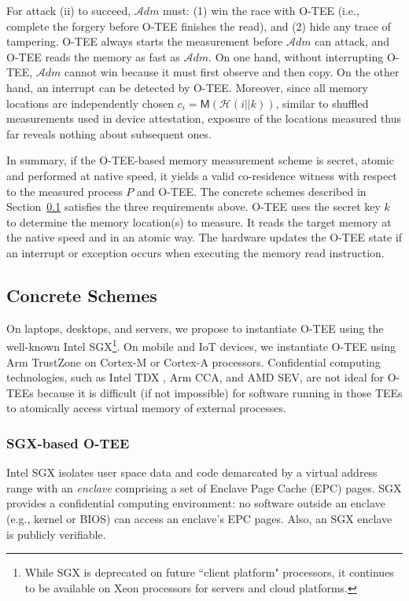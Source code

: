 \documentclass[letterpaper,twocolumn,10pt]{article}
\newcommand{\ADM}{\ensuremath{\mathcal{A}dm}\xspace}
\begin{document}
For attack (ii) to succeed, \ADM must: (1) win the race with O-TEE (i.e., complete the forgery before
O-TEE finishes the read), and (2) hide any trace of tampering. O-TEE always starts the measurement before
\ADM can attack, and O-TEE reads the memory as fast as \ADM. On one hand, without interrupting O-TEE,
\ADM cannot win because it must first observe and then copy. On the other hand, an interrupt can be detected
by O-TEE. Moreover, since all memory locations are independently chosen $c_i=\mathsf{M}(\mathcal{H}(i||k))$, similar to shuffled measurements \cite{GRT18} used in device attestation,
exposure of the locations measured thus far reveals nothing about subsequent ones.

In summary, if the O-TEE-based memory measurement scheme is secret, atomic and performed at native speed,
it yields a valid co-residence witness with respect to the measured process $P$ and O-TEE.
The concrete schemes described in Section~\ref{sec:tee} satisfies the three requirements above.
O-TEE uses the secret key $k$ to determine the memory location(s) to measure.
It reads the target memory at the native speed and in an atomic way.
The hardware updates the O-TEE state if an interrupt or exception occurs when executing the memory read instruction.


\subsection{Concrete Schemes}
\label{sec:tee}
On laptops, desktops, and servers, we propose to instantiate O-TEE using the well-known Intel SGX\footnote{While
SGX is deprecated on future ``client platform" processors, it continues to be available on Xeon processors for
servers and cloud platforms.}. On mobile and IoT devices, we instantiate O-TEE using Arm TrustZone on Cortex-M or
Cortex-A processors. Confidential computing technologies, such as Intel TDX \cite{tdx}, Arm CCA, and AMD SEV,
are not ideal for O-TEEs because it is difficult (if not impossible) for software running in those TEEs to
atomically access virtual memory of external processes.

\subsubsection{SGX-based O-TEE}
\label{sec:enclave}
%
Intel SGX isolates user space data and code demarcated by a virtual address range with an \emph{enclave}
comprising a set of Enclave Page Cache (EPC) pages. SGX provides a confidential computing environment:
no software outside an enclave (e.g., kernel or BIOS) can access an enclave's EPC pages.
Also, an SGX enclave is publicly verifiable.
\end{document}
